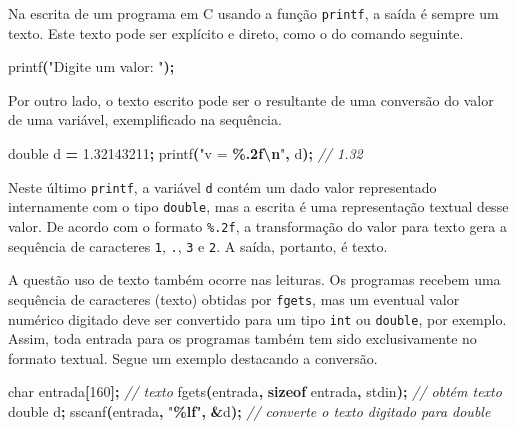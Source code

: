 \documentclass[
  11pt,
  a4paper,
]{scrbook}
\newenvironment{Shaded}{\begin{snugshade}}{\end{snugshade}}
\newcommand{\CommentTok}[1]{\textcolor[rgb]{0.56,0.35,0.01}{\textit{#1}}}
\newcommand{\DataTypeTok}[1]{\textcolor[rgb]{0.13,0.29,0.53}{#1}}
\newcommand{\DecValTok}[1]{\textcolor[rgb]{0.00,0.00,0.81}{#1}}
\newcommand{\FloatTok}[1]{\textcolor[rgb]{0.00,0.00,0.81}{#1}}
\newcommand{\KeywordTok}[1]{\textcolor[rgb]{0.13,0.29,0.53}{\textbf{#1}}}
\newcommand{\NormalTok}[1]{#1}
\newcommand{\OperatorTok}[1]{\textcolor[rgb]{0.81,0.36,0.00}{\textbf{#1}}}
\newcommand{\SpecialCharTok}[1]{\textcolor[rgb]{0.81,0.36,0.00}{\textbf{#1}}}
\newcommand{\StringTok}[1]{\textcolor[rgb]{0.31,0.60,0.02}{#1}}
\begin{document}
Na escrita de um programa em C usando a função \texttt{printf}, a saída
é sempre um texto. Este texto pode ser explícito e direto, como o do
comando seguinte.

\begin{Shaded}
\begin{Highlighting}[]
\NormalTok{printf}\OperatorTok{(}\StringTok{"Digite um valor: "}\OperatorTok{);}
\end{Highlighting}
\end{Shaded}

Por outro lado, o texto escrito pode ser o resultante de uma conversão
do valor de uma variável, exemplificado na sequência.

\begin{Shaded}
\begin{Highlighting}[]
\DataTypeTok{double}\NormalTok{ d }\OperatorTok{=} \FloatTok{1.32143211}\OperatorTok{;}
\NormalTok{printf}\OperatorTok{(}\StringTok{"v = }\SpecialCharTok{\%.2f\textbackslash{}n}\StringTok{"}\OperatorTok{,}\NormalTok{ d}\OperatorTok{);}  \CommentTok{// 1.32}
\end{Highlighting}
\end{Shaded}

Neste último \texttt{printf}, a variável \texttt{d} contém um dado valor
representado internamente com o tipo \texttt{double}, mas a escrita é
uma representação textual desse valor. De acordo com o formato
\texttt{\%.2f}, a transformação do valor para texto gera a sequência de
caracteres \texttt{1}, \texttt{.}, \texttt{3} e \texttt{2}. A saída,
portanto, é texto.

A questão uso de texto também ocorre nas leituras. Os programas recebem
uma sequência de caracteres (texto) obtidas por \texttt{fgets}, mas um
eventual valor numérico digitado deve ser convertido para um tipo
\texttt{int} ou \texttt{double}, por exemplo. Assim, toda entrada para
os programas também tem sido exclusivamente no formato textual. Segue um
exemplo destacando a conversão.

\begin{Shaded}
\begin{Highlighting}[]
\DataTypeTok{char}\NormalTok{ entrada}\OperatorTok{[}\DecValTok{160}\OperatorTok{];}  \CommentTok{// texto}
\NormalTok{fgets}\OperatorTok{(}\NormalTok{entrada}\OperatorTok{,} \KeywordTok{sizeof}\NormalTok{ entrada}\OperatorTok{,}\NormalTok{ stdin}\OperatorTok{);}  \CommentTok{// obtém texto}
\DataTypeTok{double}\NormalTok{ d}\OperatorTok{;}
\NormalTok{sscanf}\OperatorTok{(}\NormalTok{entrada}\OperatorTok{,} \StringTok{"}\SpecialCharTok{\%lf}\StringTok{"}\OperatorTok{,} \OperatorTok{\&}\NormalTok{d}\OperatorTok{);}  \CommentTok{// converte o texto digitado para double}
\end{Highlighting}
\end{Shaded}
\end{document}
